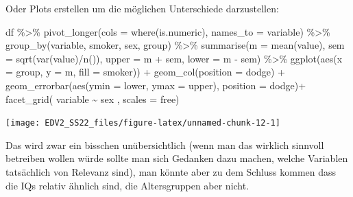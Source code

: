 \documentclass[
]{book}
\newenvironment{Shaded}{\begin{snugshade}}{\end{snugshade}}
\newcommand{\AttributeTok}[1]{\textcolor[rgb]{0.77,0.63,0.00}{#1}}
\newcommand{\FunctionTok}[1]{\textcolor[rgb]{0.00,0.00,0.00}{#1}}
\newcommand{\NormalTok}[1]{#1}
\newcommand{\SpecialCharTok}[1]{\textcolor[rgb]{0.00,0.00,0.00}{#1}}
\newcommand{\StringTok}[1]{\textcolor[rgb]{0.31,0.60,0.02}{#1}}
\begin{document}
Oder Plots erstellen um die möglichen Unterschiede darzustellen:

\begin{Shaded}
\begin{Highlighting}[]
\NormalTok{df }\SpecialCharTok{\%\textgreater{}\%} 
  \FunctionTok{pivot\_longer}\NormalTok{(}\AttributeTok{cols =} \FunctionTok{where}\NormalTok{(is.numeric),}
               \AttributeTok{names\_to =} \StringTok{\textquotesingle{}variable\textquotesingle{}}\NormalTok{) }\SpecialCharTok{\%\textgreater{}\%} 
  \FunctionTok{group\_by}\NormalTok{(variable, smoker, sex, group) }\SpecialCharTok{\%\textgreater{}\%} 
  \FunctionTok{summarise}\NormalTok{(}\AttributeTok{m =} \FunctionTok{mean}\NormalTok{(value),}
            \AttributeTok{sem =} \FunctionTok{sqrt}\NormalTok{(}\FunctionTok{var}\NormalTok{(value)}\SpecialCharTok{/}\FunctionTok{n}\NormalTok{()),}
            \AttributeTok{upper =}\NormalTok{ m }\SpecialCharTok{+}\NormalTok{ sem,}
            \AttributeTok{lower =}\NormalTok{ m }\SpecialCharTok{{-}}\NormalTok{ sem) }\SpecialCharTok{\%\textgreater{}\%} 
  \FunctionTok{ggplot}\NormalTok{(}\FunctionTok{aes}\NormalTok{(}\AttributeTok{x =}\NormalTok{ group,}
             \AttributeTok{y =}\NormalTok{ m,}
             \AttributeTok{fill =}\NormalTok{ smoker)) }\SpecialCharTok{+}
  \FunctionTok{geom\_col}\NormalTok{(}\AttributeTok{position =} \StringTok{\textquotesingle{}dodge\textquotesingle{}}\NormalTok{) }\SpecialCharTok{+}
  \FunctionTok{geom\_errorbar}\NormalTok{(}\FunctionTok{aes}\NormalTok{(}\AttributeTok{ymin =}\NormalTok{ lower,}
                    \AttributeTok{ymax =}\NormalTok{ upper),}
                \AttributeTok{position =} \StringTok{\textquotesingle{}dodge\textquotesingle{}}\NormalTok{)}\SpecialCharTok{+}
  \FunctionTok{facet\_grid}\NormalTok{( variable }\SpecialCharTok{\textasciitilde{}}\NormalTok{ sex , }\AttributeTok{scales =} \StringTok{\textquotesingle{}free\textquotesingle{}}\NormalTok{)}
\end{Highlighting}
\end{Shaded}

\begin{center}\texttt{[image: EDV2\_SS22\_files/figure-latex/unnamed-chunk-12-1]} \end{center}

Das wird zwar ein bisschen unübersichtlich (wenn man das wirklich sinnvoll betreiben wollen würde sollte man sich Gedanken dazu machen, welche Variablen tatsächlich von Relevanz sind), man könnte aber zu dem Schluss kommen dass die IQs relativ ähnlich sind, die Altersgruppen aber nicht.
\end{document}
